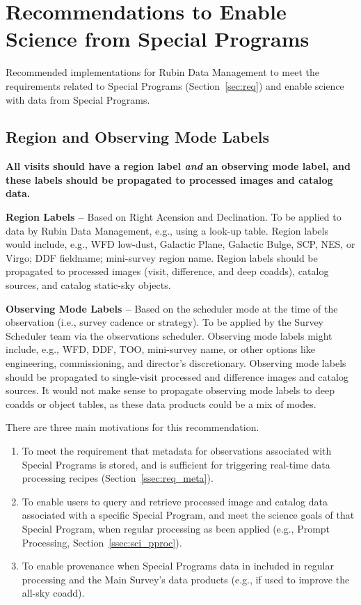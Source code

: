 \section{Recommendations to Enable Science from Special Programs}\label{sec:sci}

Recommended implementations for Rubin Data Management to meet the 
requirements related to Special Programs (Section~\ref{sec:req})
and enable science with data from Special Programs.

\subsection{Region and Observing Mode Labels}\label{ssec:sci_labels}

\textbf{All visits should have a region label \textit{and} an observing mode 
label, and these labels should be propagated to processed images and catalog data.}

\textbf{Region Labels -- } 
Based on Right Acension and Declination.
To be applied to data by Rubin Data Management, e.g., using a look-up table.
Region labels would include, e.g., WFD low-dust, Galactic Plane, Galactic 
Bulge, SCP, NES, or Virgo; DDF fieldname; mini-survey region name.
Region labels should be propagated to processed images (visit, 
difference, and deep coadds), catalog sources, and catalog static-sky objects. 

\textbf{Observing Mode Labels -- } 
Based on the scheduler mode at the time of the observation
(i.e., survey cadence or strategy).
To be applied by the Survey Scheduler team via the observations scheduler.
Observing mode labels might include, e.g., WFD, DDF, TOO, mini-survey name, or other 
options like engineering, commissioning, and director's discretionary.
Observing mode  labels should be propagated to single-visit processed and 
difference images and catalog sources.
It would not make sense to propagate observing mode labels to deep coadds or 
object tables, as these data products could be a mix of modes.

There are three main motivations for this recommendation.

\begin{enumerate}

\item To meet the requirement that metadata for observations associated 
with Special Programs is stored, and is sufficient for triggering 
real-time data processing recipes (Section~\ref{ssec:req_meta}).

\item To enable users to query and retrieve processed image and catalog
data associated with a specific Special Program, and meet the science goals
of that Special Program, when regular processing as been applied 
(e.g., Prompt Processing, Section~\ref{ssec:sci_pproc}).

\item To enable provenance when Special Programs data in included in regular
processing and the Main Survey's data products (e.g., if used to improve the
all-sky coadd).

\end{enumerate}

